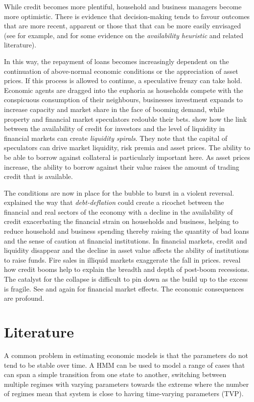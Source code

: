 \documentclass[12pt, a4paper, oneside]{article} %
\begin{document}
While credit becomes more plentiful, household and business managers become more optimistic.  There is evidence that decision-making tends to favour outcomes that are more recent, apparent or those that that can be more easily envisaged (see for example, \citet{KTAvailability} and \citet{Schwartzavailability} for some evidence on the \emph{availability heuristic} and related literature).   %

In this way, the repayment of loans becomes increasingly dependent on the continuation of above-normal economic conditions or the appreciation of asset prices.  If this process is allowed to continue, a speculative frenzy can take hold.  Economic agents are dragged into the euphoria as households compete with the conspicuous consumption of their neighbours, businesses investment expands to increase capacity and market share in the face of booming demand, while property and financial market speculators redouble their bets.  \citet{BrunnermeierLiquidity} show how the link between the availability of credit for investors and the level of liquidity in financial markets can create \emph{liquidity spirals}.   They note that the capital of speculators can drive market liquidity, risk premia and asset prices.  The ability to be able to borrow against collateral is particularly important here.  As asset prices increase, the ability to borrow against their value raises the amount of trading credit that is available.  

The conditions are now in place for the bubble to burst in a violent reversal.  \citet{FisherBD, FisherDD} explained the way that \emph{debt-deflation} could create a ricochet between the financial and real sectors of the economy with a decline in the availability of credit exacerbating the financial strain on households and business, helping to reduce household and business spending thereby raising the quantity of bad loans and the sense of caution at financial institutions. In financial markets, credit and liquidity disappear and the decline in asset value affects the ability of institutions to raise funds.  Fire sales in illiquid markets exaggerate the fall in prices. \citet{ReinhartRogoff} reveal how credit booms help to explain the breadth and depth of post-boom recessions.  The catalyst for the collapse is difficult to pin down as the build up to the excess is fragile.  See \citet{Gorton2013} and \citet{BrunnermeierLiquidity} again for financial market effects. The economic consequences are profound.  

\section{Literature}
A common problem in estimating economic models is that the parameters do not tend to be stable over time.  A HMM can be used to model a range of cases that can span a simple transition from one state to another, switching between multiple regimes with varying parameters towards the extreme where the number of regimes mean that system is close to having time-varying parameters (TVP).  
\end{document}

